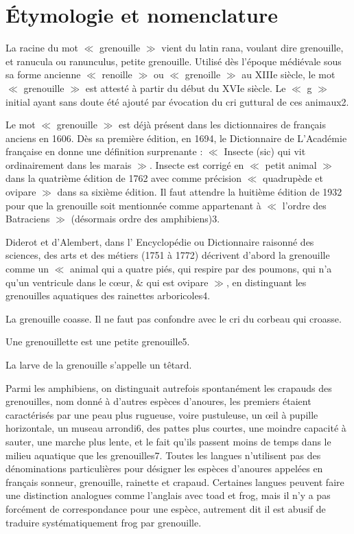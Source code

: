 \section{Étymologie et nomenclature}

La racine du mot $\ll$ grenouille $\gg$ vient du latin rana, voulant dire grenouille, et ranucula ou ranunculus, petite grenouille. Utilisé dès l'époque médiévale sous sa forme ancienne $\ll$ renoille $\gg$ ou $\ll$ grenoille $\gg$ au XIIIe siècle, le mot $\ll$ grenouille $\gg$ est attesté à partir du début du XVIe siècle. Le $\ll$ g $\gg$ initial ayant sans doute été ajouté par évocation du cri guttural de ces animaux2.

Le mot $\ll$ grenouille $\gg$ est déjà présent dans les dictionnaires de français anciens en 1606. Dès sa première édition, en 1694, le Dictionnaire de L'Académie française en donne une définition surprenante : $\ll$ Insecte (sic) qui vit ordinairement dans les marais $\gg$. Insecte est corrigé en $\ll$ petit animal $\gg$ dans la quatrième édition de 1762 avec comme précision $\ll$ quadrupède et ovipare $\gg$ dans sa sixième édition. Il faut attendre la huitième édition de 1932 pour que la grenouille soit mentionnée comme appartenant à $\ll$ l'ordre des Batraciens $\gg$ (désormais ordre des amphibiens)3.

Diderot et d'Alembert, dans l' Encyclopédie ou Dictionnaire raisonné des sciences, des arts et des métiers (1751 à 1772) décrivent d'abord la grenouille comme un $\ll$ animal qui a quatre piés, qui respire par des poumons, qui n'a qu'un ventricule dans le cœur, \& qui est ovipare $\gg$, en distinguant les grenouilles aquatiques des rainettes arboricoles4.

La grenouille coasse. Il ne faut pas confondre avec le cri du corbeau qui croasse.

Une grenouillette est une petite grenouille5.

La larve de la grenouille s'appelle un têtard.

Parmi les amphibiens, on distinguait autrefois spontanément les crapauds des grenouilles, nom donné à d'autres espèces d'anoures, les premiers étaient caractérisés par une peau plus rugueuse, voire pustuleuse, un œil à pupille horizontale, un museau arrondi6, des pattes plus courtes, une moindre capacité à sauter, une marche plus lente, et le fait qu'ils passent moins de temps dans le milieu aquatique que les grenouilles7. Toutes les langues n'utilisent pas des dénominations particulières pour désigner les espèces d'anoures appelées en français sonneur, grenouille, rainette et crapaud. Certaines langues peuvent faire une distinction analogues comme l'anglais avec toad et frog, mais il n'y a pas forcément de correspondance pour une espèce, autrement dit il est abusif de traduire systématiquement frog par grenouille. 